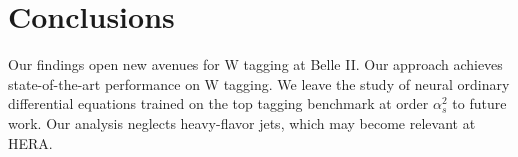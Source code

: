 \section{Conclusions}\label{sec:conclusions}

Our findings open new avenues for W tagging at Belle II. Our approach
achieves state-of-the-art performance on W tagging. We leave the study
of neural ordinary differential equations trained on the top tagging
benchmark at order $\alpha_s^2$ to future work. Our analysis neglects
heavy-flavor jets, which may become relevant at HERA.

